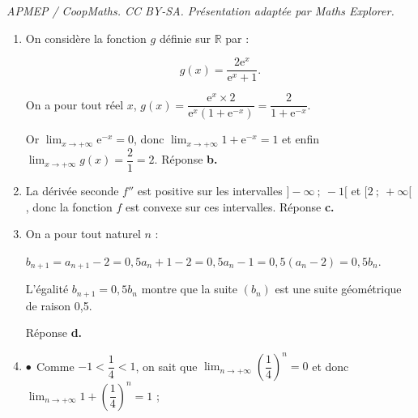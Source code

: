 \documentclass[10pt]{article}
\providecommand{\R}{\mathbb{R}}
\begin{document}
\noindent\textit{APMEP / CoopMaths. CC BY-SA. Présentation adaptée par Maths Explorer.}\par\medskip
\medskip





\medskip

\begin{enumerate}
\item On considère la fonction $g$ définie sur $\R$ par : 

\[ g(x) = \dfrac{2\text{e}^x}{\text{e}^x +1}.\]

\smallskip









On a pour tout réel $x$, \: $g(x) = \dfrac{\text{e}^x \times 2 }{\text{e}^x\left(1 + \text{e}^{-x}\right)} = \dfrac{2}{1 + \text{e}^{-x}}$.

Or $\displaystyle\lim_{x \to + \infty} \text{e}^{-x} = 0$, donc $\displaystyle\lim_{x \to + \infty} 1 + \text{e}^{-x} = 1$ et enfin $\displaystyle\lim_{x \to + \infty} g(x) = \dfrac{2}{1} = 2$. \hfill Réponse \textbf{b.}

\item La dérivée seconde $f''$ est positive sur les intervalles $]- \infty~;~-1[$ et $[2~;~+ \infty[$, donc la fonction $f$ est convexe sur ces intervalles. \hfill Réponse \textbf{c.}

\item 









On a pour tout naturel $n$ :

$b_{n+1} = a_{n+1} - 2 = 0,5a_n + 1 - 2 = 0,5a_n - 1 = 0,5\left(a_n - 2 \right) = 0,5b_n$.

L'égalité $b_{n+1} = 0,5b_n$ montre que la suite $\left(b_n\right)$ est une suite géométrique de raison 0,5. 

\hfill Réponse \textbf{d.}

\item 











$\bullet~~$Comme $- 1 < \dfrac{1}{4} < 1$, on sait que $\displaystyle\lim_{n \to + \infty}\left(\dfrac14\right)^n = 0$ et donc $\displaystyle\lim_{n \to + \infty}1 + \left(\dfrac14\right)^n = 1$ ;


\end{enumerate}
\end{document}
